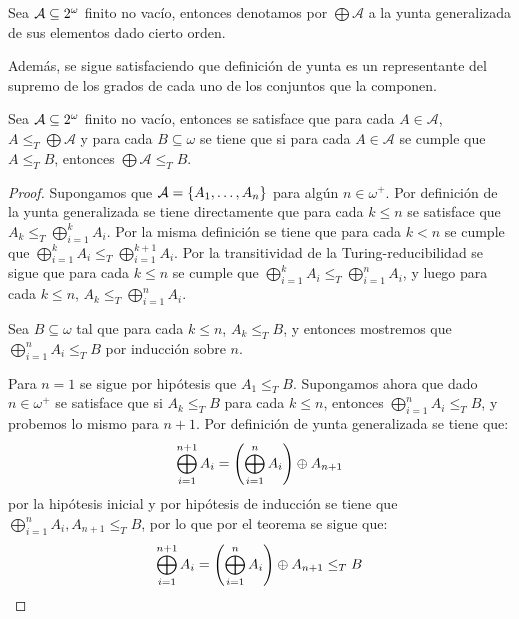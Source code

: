 \begin{agregado}
\begin{agregado}
\begin{definition}
	Sea $\mathcal{A}\subseteq\CPOTENCIA{\omega}$ finito no vacío, entonces denotamos por $\bigoplus\mathcal{A}$ a la yunta generalizada de sus elementos dado cierto orden.
\end{definition}

Además, se sigue satisfaciendo que  definición de yunta es un representante del supremo de los grados de cada uno de los conjuntos que la componen.

\begin{theorem}
	\label{theo: yunta_generalizada_supremo}
	Sea $\mathcal{A}\subseteq\CPOTENCIA{\omega}$ finito no vacío, entonces se satisface que para cada $A\in\mathcal{A}$, $A\leq_{T}\bigoplus\mathcal{A}$ y para cada $B\subseteq\omega$ se tiene que si para cada $A\in\mathcal{A}$ se cumple que $A\leq_{T} B$, entonces $\bigoplus\mathcal{A}\leq_{T} B$.
\end{theorem}

\begin{proof}
	Supongamos que $\mathcal{A} =\set*{A_{1},\dotsc, A_{n}}$ para algún $n\in\omega^{+}$. Por definición de la yunta generalizada se tiene directamente que para cada $k\leq n$ se satisface que $A_{k}\leq_{T}\bigoplus_{i = 1}^{k}A_{i}$. Por la misma definición se tiene que para cada $k < n$ se cumple que $\bigoplus_{i = 1}^{k}A_{i}\leq_{T}\bigoplus_{i = 1}^{k + 1}A_{i}$. Por la transitividad de la Turing-reducibilidad se sigue que para cada $k\leq n$ se cumple que $\bigoplus_{i = 1}^{k}A_{i}\leq_{T}\bigoplus_{i = 1}^{n}A_{i}$, y luego para cada $k\leq n$, $A_{k}\leq_{T}\bigoplus_{i = 1}^{n}A_{i}$.

	Sea $B\subseteq\omega$ tal que para cada $k\leq n$, $A_{k}\leq_{T} B$, y entonces mostremos que $\bigoplus_{i = 1}^{n}A_{i}\leq_{T} B$ por inducción sobre $n$.

	Para $n = 1$ se sigue por hipótesis que $A_{1}\leq_{T} B$. Supongamos ahora que dado $n\in\omega^{+}$ se satisface que si $A_{k}\leq_{T} B$ para cada $k\leq n$, entonces $\bigoplus_{i = 1}^{n}A_{i}\leq_{T} B$, y probemos lo mismo para $n + 1$. Por definición de yunta generalizada se tiene que:
	\[
		\bigoplus_{i = 1}^{n + 1}A_{i} =\pa*{\bigoplus_{i = 1}^{n}A_{i}}\oplus A_{n + 1}
	\]
	por la hipótesis inicial y por hipótesis de inducción se tiene que $\bigoplus_{i = 1}^{n}A_{i}, A_{n + 1}\leq_{T} B$, por lo que por el teorema  se sigue que:
	\[
		\bigoplus_{i = 1}^{n + 1}A_{i} =\pa*{\bigoplus_{i = 1}^{n}A_{i}}\oplus A_{n + 1}\leq_{T} B
	\]
\end{proof}


\end{agregado}
\end{agregado}
